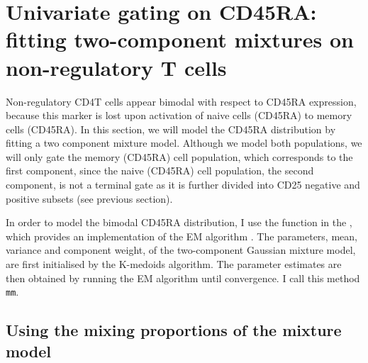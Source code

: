 \clearpage

\section{Univariate gating on CD45RA: fitting two-component mixtures on non-regulatory T cells}

Non-regulatory CD4\positive T cells appear bimodal with respect to CD45RA expression,
because this marker is lost upon activation of naive cells (CD45RA\positive) to memory cells (CD45RA\negative).
In this section, we will model the CD45RA distribution by fitting a two component mixture model.
Although we model both populations, we will only gate the memory (CD45RA\negative) cell population, which corresponds to the first component,
since the naive (CD45RA\positive) cell population, the second component, is not a terminal gate as
it is further divided into CD25 negative and positive subsets (see previous section).


In order to model the bimodal CD45RA distribution, I use the  function in the ,
which provides an implementation of the \Gls{EM} algorithm \citep{Dempster:1977ul}.
The parameters, mean, variance and component weight, of the two-component Gaussian mixture model,
are first initialised by the K-medoids algorithm.
The parameter estimates are then obtained  by running the EM algorithm until convergence.
I call this method \texttt{mm}.

\subsection{Using the mixing proportions of the mixture model}

